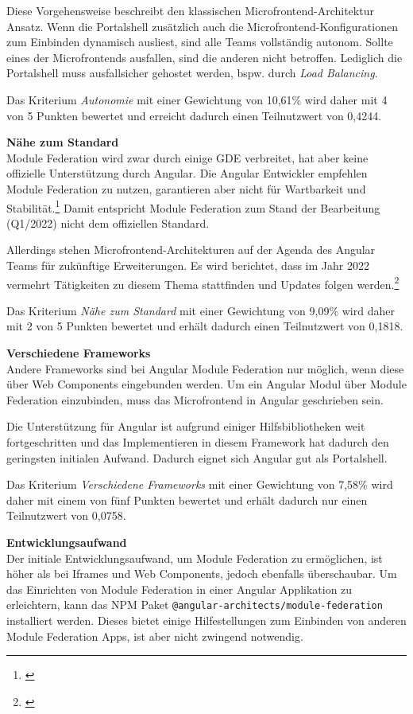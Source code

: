 Diese Vorgehensweise beschreibt den klassischen Microfrontend-Architektur Ansatz. Wenn die Portalshell zusätzlich auch die Microfrontend-Konfigurationen zum Einbinden dynamisch ausliest, sind alle Teams vollständig autonom. Sollte eines der Microfrontends ausfallen, sind die anderen nicht betroffen. Lediglich die Portalshell muss ausfallsicher gehostet werden, bspw. durch \textit{Load Balancing}.

Das Kriterium \textit{Autonomie} mit einer Gewichtung von 10,61\% wird daher mit 4 von 5 Punkten bewertet und erreicht dadurch einen Teilnutzwert von 0,4244.

\textbf{Nähe zum Standard}\\
Module Federation wird zwar durch einige \gls{GDE} verbreitet, hat aber keine offizielle Unterstützung durch Angular. Die Angular Entwickler empfehlen Module Federation zu nutzen, garantieren aber nicht für Wartbarkeit und Stabilität.\footnote{\cite[vgl.][]{Gechev2021}} 
Damit entspricht Module Federation zum Stand der Bearbeitung (Q1/2022) nicht dem offiziellen Standard.

Allerdings stehen Microfrontend-Architekturen auf der Agenda des Angular Teams für zukünftige Erweiterungen. Es wird berichtet, dass im Jahr 2022 vermehrt Tätigkeiten zu diesem Thema stattfinden und Updates folgen werden.\footnote{\cite[vgl.][]{Angular2021a}} 

Das Kriterium \textit{Nähe zum Standard} mit einer Gewichtung von 9,09\% wird daher mit 2 von 5 Punkten bewertet und erhält dadurch einen Teilnutzwert von 0,1818.

\textbf{Verschiedene Frameworks}\\
Andere Frameworks sind bei Angular Module Federation nur möglich, wenn diese über Web Components eingebunden werden. Um ein Angular Modul über Module Federation einzubinden, muss das Microfrontend in Angular geschrieben sein.

Die Unterstützung für Angular ist aufgrund einiger Hilfsbibliotheken weit fortgeschritten und das Implementieren in diesem Framework hat dadurch den geringsten initialen Aufwand. Dadurch eignet sich Angular gut als Portalshell.

Das Kriterium \textit{Verschiedene Frameworks} mit einer Gewichtung von 7,58\% wird daher mit einem von fünf Punkten bewertet und erhält dadurch nur einen Teilnutzwert von 0,0758.

\textbf{Entwicklungsaufwand}\\
Der initiale Entwicklungsaufwand, um Module Federation zu ermöglichen, ist höher als bei Iframes und Web Components, jedoch ebenfalls überschaubar. Um das Einrichten von Module Federation in einer Angular Applikation zu erleichtern, kann das \gls{NPM} Paket \texttt{@angular-architects/module-federation} installiert werden. Dieses bietet einige Hilfestellungen zum Einbinden von anderen Module Federation Apps, ist aber nicht zwingend notwendig.

